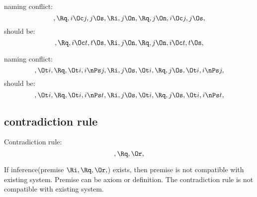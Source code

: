 naming conflict:
\[, \Rq , i \Oc j, j \Os, \Ri , j \On, \Rq , j \On, i \Oc j, j \Os,\]
should be:
\[, \Rq , i \Oc t, t \Os, \Ri , j \On, \Rq , j \On, i \Oc t, t \Os,\]

naming conflict:
\[, \Ot i,  \Rq , \Ot i, i \nPs j, \Ri , j \Os, \Ot i, \Rq , j \Os, \Ot i, i \nPs j, \]
should be:
\[, \Ot i,  \Rq , \Ot i, i \nPs t, \Ri , j \Os, \Ot i, \Rq , j \Os, \Ot i, i \nPs t,\]

\subsection{contradiction rule}
Contradiction rule:
\[, \Rq , \Or, \]

If inference(premise \( \Ri , \Rq , \Or, \)) exists, then premise is not compatible with existing system. Premise can be axiom or definition. The contradiction rule is not compatible with existing system. 


